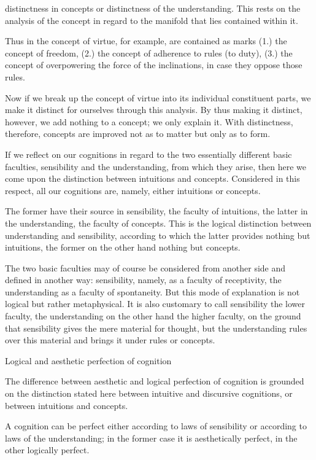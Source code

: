 distinctness in concepts or distinctness of the understanding.
This rests on the analysis of the concept in regard to
the manifold that lies contained within it.

Thus in the concept of virtue, for example, are contained as marks
(1.) the concept of freedom,
(2.) the concept of adherence to rules (to duty),
(3.) the concept of overpowering the force of the inclinations,
in case they oppose those rules.

    Now if we break up the concept of virtue
    into its individual constituent parts,
    we make it distinct for ourselves through this analysis.
    By thus making it distinct, however, we add nothing to a concept;
    we only explain it.
    With distinctness, therefore, concepts are improved
    not as to matter but only as to form.

If we reflect on our cognitions in regard to the two essentially different
basic faculties, sensibility and the understanding, from which they arise,
then here we come upon the distinction between intuitions and concepts.
Considered in this respect, all our cognitions are, namely,
either intuitions or concepts.

The former have their source in sensibility, the faculty of intuitions,
the latter in the understanding, the faculty of concepts.
This is the logical distinction between understanding and sensibility,
according to which the latter provides nothing but intuitions,
the former on the other hand nothing but concepts.

    The two basic faculties may of course be considered
    from another side and defined in another way:
    sensibility, namely, as a faculty of receptivity,
    the understanding as a faculty of spontaneity.
    But this mode of explanation is not logical but rather metaphysical.
    It is also customary to call sensibility the lower faculty,
    the understanding on the other hand the higher faculty,
    on the ground that sensibility gives the mere material for thought,
    but the understanding rules over this material
    and brings it under rules or concepts.

Logical and aesthetic perfection of cognition

The difference between aesthetic and logical perfection of cognition
is grounded on the distinction stated here
between intuitive and discursive cognitions, or
between intuitions and concepts.

A cognition can be perfect either
according to laws of sensibility or
according to laws of the understanding;
in the former case it is aesthetically perfect,
in the other logically perfect.

